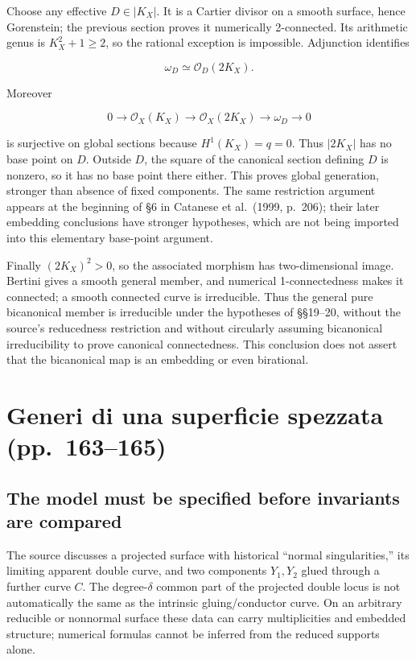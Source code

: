 Choose any effective \(D\in|K_X|\). It is a Cartier divisor on a smooth surface, hence Gorenstein; the previous section proves it numerically 2-connected. Its arithmetic genus is \(K_X^2+1\ge 2\), so the rational exception is impossible. Adjunction identifies

\[
\omega_D\simeq\mathcal O_D(2K_X).
\]

Moreover

\[
0\to\mathcal O_X(K_X)\to\mathcal O_X(2K_X)
\to\omega_D\to0
\]

is surjective on global sections because \(H^1(K_X)=q=0\). Thus \(|2 K_X|\) has no base point on \(D\). Outside \(D\), the square of the canonical section defining \(D\) is nonzero, so it has no base point there either. This proves global generation, stronger than absence of fixed components. The same restriction argument appears at the beginning of §6 in Catanese et al.~(1999, p.~206); their later embedding conclusions have stronger hypotheses, which are not being imported into this elementary base-point argument.

Finally \((2 K_X)^2>0\), so the associated morphism has two-dimensional image. Bertini gives a smooth general member, and numerical 1-connectedness makes it connected; a smooth connected curve is irreducible. Thus the general pure bicanonical member is irreducible under the hypotheses of §§19--20, without the source's reducedness restriction and without circularly assuming bicanonical irreducibility to prove canonical connectedness. This conclusion does not assert that the bicanonical map is an embedding or even birational.

\section[Generi di una superficie spezzata]{Generi di una superficie spezzata (pp.~163--165)}\label{enriques-iv-21}

\subsection{The model must be specified before invariants are compared}

The source discusses a projected surface with historical ``normal singularities,'' its limiting apparent double curve, and two components \(Y_1,Y_2\) glued through a further curve \(C\). The degree-\(\delta\) common part of the projected double locus is not automatically the same as the intrinsic gluing/conductor curve. On an arbitrary reducible or nonnormal surface these data can carry multiplicities and embedded structure; numerical formulas cannot be inferred from the reduced supports alone.

